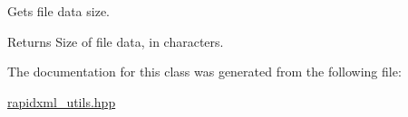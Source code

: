 Gets file data size. \begin{DoxyReturn}{Returns}
Size of file data, in characters. 
\end{DoxyReturn}


The documentation for this class was generated from the following file\+:\begin{DoxyCompactItemize}
\item 
\mbox{\hyperlink{rapidxml__utils_8hpp}{rapidxml\+\_\+utils.\+hpp}}\end{DoxyCompactItemize}
